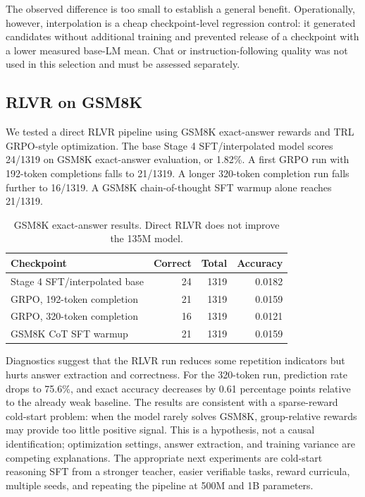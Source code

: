 \documentclass[11pt]{article}
\begin{document}
The observed difference is too small to establish a general benefit. Operationally, however, interpolation is a cheap checkpoint-level regression control: it generated candidates without additional training and prevented release of a checkpoint with a lower measured base-LM mean. Chat or instruction-following quality was not used in this selection and must be assessed separately.

\subsection{RLVR on GSM8K}

We tested a direct RLVR pipeline using GSM8K exact-answer rewards and TRL GRPO-style optimization. The base Stage 4 SFT/interpolated model scores 24/1319 on GSM8K exact-answer evaluation, or 1.82\%. A first GRPO run with 192-token completions falls to 21/1319. A longer 320-token completion run falls further to 16/1319. A GSM8K chain-of-thought SFT warmup alone reaches 21/1319.

\begin{table}[h]
\centering
\small
\begin{tabular}{lrrr}
\toprule
Checkpoint & Correct & Total & Accuracy \\
\midrule
Stage 4 SFT/interpolated base & 24 & 1319 & 0.0182 \\
GRPO, 192-token completion & 21 & 1319 & 0.0159 \\
GRPO, 320-token completion & 16 & 1319 & 0.0121 \\
GSM8K CoT SFT warmup & 21 & 1319 & 0.0159 \\
\bottomrule
\end{tabular}
\caption{GSM8K exact-answer results. Direct RLVR does not improve the 135M model.}
\label{tab:rlvr}
\end{table}

Diagnostics suggest that the RLVR run reduces some repetition indicators but hurts answer extraction and correctness. For the 320-token run, prediction rate drops to 75.6\%, and exact accuracy decreases by 0.61 percentage points relative to the already weak baseline. The results are consistent with a sparse-reward cold-start problem: when the model rarely solves GSM8K, group-relative rewards may provide too little positive signal. This is a hypothesis, not a causal identification; optimization settings, answer extraction, and training variance are competing explanations. The appropriate next experiments are cold-start reasoning SFT from a stronger teacher, easier verifiable tasks, reward curricula, multiple seeds, and repeating the pipeline at 500M and 1B parameters.
\end{document}
